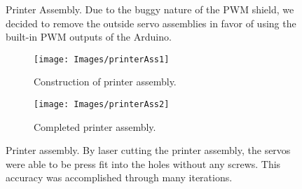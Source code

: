 \documentclass[11pt, oneside]{article}
\newcommand\drawServoAssembly{
    \draw[fill = gray] (0,0) rectangle (0.35,0.6);

    \draw[rotate=30,rounded corners=1,fill = white] (0.2,0.15) rectangle (1.3,0.36);
    \draw[rotate=30,rounded corners=1,fill = white] (0.8,0.21) rectangle (1.15,0.3);
    \draw[fill = gray] (0.175,0.4) circle (0.05);
    
    \draw[fill = white,rounded corners = 4] (0.57,-3) rectangle (0.85,0.9);
    \path[fill = black] (0.6,-2.95)--(0.82,-2.95)--(0.7,-3.25)--cycle;
    
    \begin{scope}[shift={(0.71,0.72)},scale = 0.07]
        \drawScrewHead;
    \end{scope}
}
\newcommand\drawScrewHead{
    \draw (0,0) circle (1);
    \draw (0,-0.75)--(0,0.75);
    \draw (-0.75,0)--(0.75,0);
}
\newcommand\drawCross{
    \draw[red,line width=2] (0,0)--(1,1);
    \draw[red,line width=2] (0,1)--(1,0);
}
\begin{document}
\begin{figure}[H]
    \centering
    \caption{Printer Assembly. Due to the buggy nature of the PWM shield, we decided to remove the outside servo assemblies in favor of using the built-in PWM outputs of the Arduino.}
    \label{fig:PrintAssFront}
\end{figure}
\begin{figure}[H]
    \centering
    \begin{subfigure}[b]{0.4\textwidth}
        \centering
        \texttt{[image: Images/printerAss1]}
        \caption{Construction of printer assembly.}
        \label{fig:printerAss1}
    \end{subfigure}
    \begin{subfigure}[b]{0.38\textwidth}
        \texttt{[image: Images/printerAss2]}
        \caption{Completed printer assembly.}
        \label{fig:printerAss2}
    \end{subfigure}
    \caption{Printer assembly. By laser cutting the printer assembly, the servos were able to be press fit into the holes without any screws. This accuracy was accomplished through many iterations.}
    \label{fig:printerAss2}
\end{figure}
\end{document}
